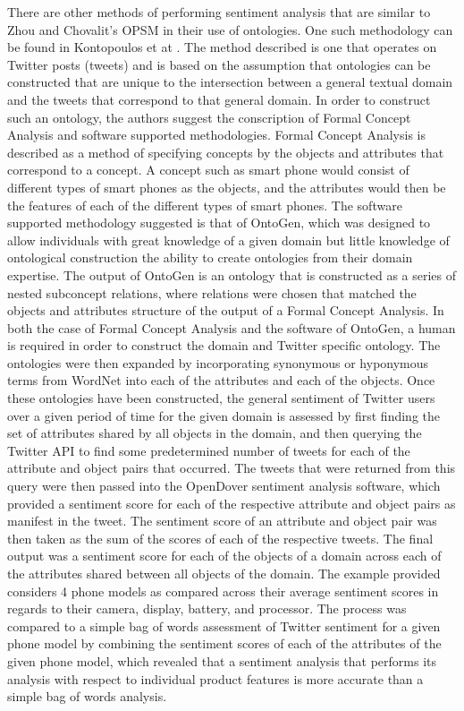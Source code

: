 \documentclass[letterpaper, 10 pt, conference]{ieeeconf}
\begin{document}
There are other methods of performing sentiment analysis that are similar to Zhou and Chovalit's OPSM in their use of ontologies. One such methodology can be found in Kontopoulos et at \textcolor{gray}{\cite{Kontopoulos}}. The method described is one that operates on Twitter posts (tweets) and is based on the assumption that ontologies can be constructed that are unique to the intersection between a general textual domain and the tweets that correspond to that general domain. In order to construct such an ontology, the authors suggest the conscription of Formal Concept Analysis and software supported methodologies. Formal Concept Analysis is described as a method of specifying concepts by the objects and attributes that correspond to a concept. A concept such as smart phone would consist of different types of smart phones as the objects, and the attributes would then be the features of each of the different types of smart phones. The software supported methodology suggested is that of OntoGen, which was designed to allow individuals with great knowledge of a given domain but little knowledge of ontological construction the ability to create ontologies from their domain expertise. The output of OntoGen is an ontology that is constructed as a series of nested subconcept relations, where relations were chosen that matched the objects and attributes structure of the output of a Formal Concept Analysis. In both the case of Formal Concept Analysis and the software of OntoGen, a human is required in order to construct the domain and Twitter specific ontology. The ontologies were then expanded by incorporating synonymous or hyponymous terms from WordNet into each of the attributes and each of the objects. Once these ontologies have been constructed, the general sentiment of Twitter users over a given period of time for the given domain is assessed by first finding the set of attributes shared by all objects in the domain, and then querying the Twitter API to find some predetermined number of tweets for each of the attribute and object pairs that occurred. The tweets that were returned from this query were then passed into the OpenDover sentiment analysis software, which provided a sentiment score for each of the respective attribute and object pairs as manifest in the tweet. The sentiment score of an attribute and object pair was then taken as the sum of the scores of each of the respective tweets. The final output was a sentiment score for each of the objects of a domain across each of the attributes shared between all objects of the domain. The example provided considers 4 phone models as compared across their average sentiment scores in regards to their camera, display, battery, and processor. The process was compared to a simple bag of words assessment of Twitter sentiment for a given phone model by combining the sentiment scores of each of the attributes of the given phone model, which revealed that a sentiment analysis that performs its analysis with respect to individual product features is more accurate than a simple bag of words analysis.
\end{document}
